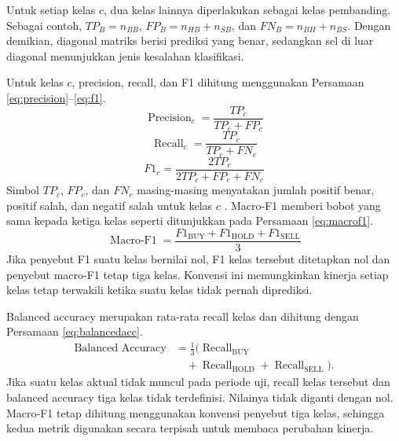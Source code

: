 Untuk setiap kelas $c$, dua kelas lainnya diperlakukan sebagai kelas pembanding. Sebagai contoh, $TP_B=n_{BB}$, $FP_B=n_{HB}+n_{SB}$, dan $FN_B=n_{BH}+n_{BS}$. Dengan demikian, diagonal matriks berisi prediksi yang benar, sedangkan sel di luar diagonal menunjukkan jenis kesalahan klasifikasi.

Untuk kelas $c$, precision, recall, dan F1 dihitung menggunakan Persamaan \ref{eq:precision}--\ref{eq:f1}.
\begin{equation}
\operatorname{Precision}_c=\frac{TP_c}{TP_c+FP_c}
\label{eq:precision}
\end{equation}
\begin{equation}
\operatorname{Recall}_c=\frac{TP_c}{TP_c+FN_c}
\label{eq:recall}
\end{equation}
\begin{equation}
F1_c=\frac{2TP_c}{2TP_c+FP_c+FN_c}
\label{eq:f1}
\end{equation}
Simbol $TP_c$, $FP_c$, dan $FN_c$ masing-masing menyatakan jumlah positif benar, positif salah, dan negatif salah untuk kelas $c$ \parencite{sokolova2009systematic}. Macro-F1 memberi bobot yang sama kepada ketiga kelas seperti ditunjukkan pada Persamaan \ref{eq:macrof1}.
\begin{equation}
\operatorname{Macro\text{-}F1}=\frac{F1_{\mathrm{BUY}}+F1_{\mathrm{HOLD}}+F1_{\mathrm{SELL}}}{3}
\label{eq:macrof1}
\end{equation}
Jika penyebut F1 suatu kelas bernilai nol, F1 kelas tersebut ditetapkan nol dan penyebut macro-F1 tetap tiga kelas. Konvensi ini memungkinkan kinerja setiap kelas tetap terwakili ketika suatu kelas tidak pernah diprediksi.

Balanced accuracy merupakan rata-rata recall kelas dan dihitung dengan Persamaan \ref{eq:balancedacc}.
\begin{equation}
\begin{split}
\operatorname{Balanced\ Accuracy} &= \frac{1}{3} \big( \operatorname{Recall}_{\mathrm{BUY}} \\
&\quad + \operatorname{Recall}_{\mathrm{HOLD}} + \operatorname{Recall}_{\mathrm{SELL}} \big).
\end{split}
\label{eq:balancedacc}
\end{equation}
Jika suatu kelas aktual tidak muncul pada periode uji, recall kelas tersebut dan balanced accuracy tiga kelas tidak terdefinisi. Nilainya tidak diganti dengan nol. Macro-F1 tetap dihitung menggunakan konvensi penyebut tiga kelas, sehingga kedua metrik digunakan secara terpisah untuk membaca perubahan kinerja.
